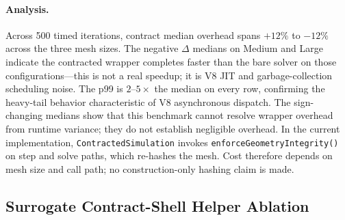 \documentclass[journal]{IEEEtran}
\begin{document}
\paragraph{Analysis.}
Across 500 timed iterations, contract median overhead spans $+12\%$ to
$-12\%$ across the three mesh sizes. The negative $\Delta$ medians on
Medium and Large indicate the contracted wrapper completes faster than
the bare solver on those configurations---this is not a real speedup; it
is V8 JIT and garbage-collection scheduling noise. The p99 is
$2\text{--}5\times$ the median on every row, confirming the heavy-tail
behavior characteristic of V8 asynchronous dispatch. The sign-changing medians
show that this benchmark cannot resolve wrapper overhead from runtime variance;
they do not establish negligible overhead. In the current implementation,
\texttt{ContractedSimulation} invokes \texttt{enforceGeometryIntegrity()} on
step and solve paths, which re-hashes the mesh. Cost therefore depends on mesh
size and call path; no construction-only hashing claim is made.

\subsection{Surrogate Contract-Shell Helper Ablation}
\label{sec:evaluation:ablation}
\end{document}
